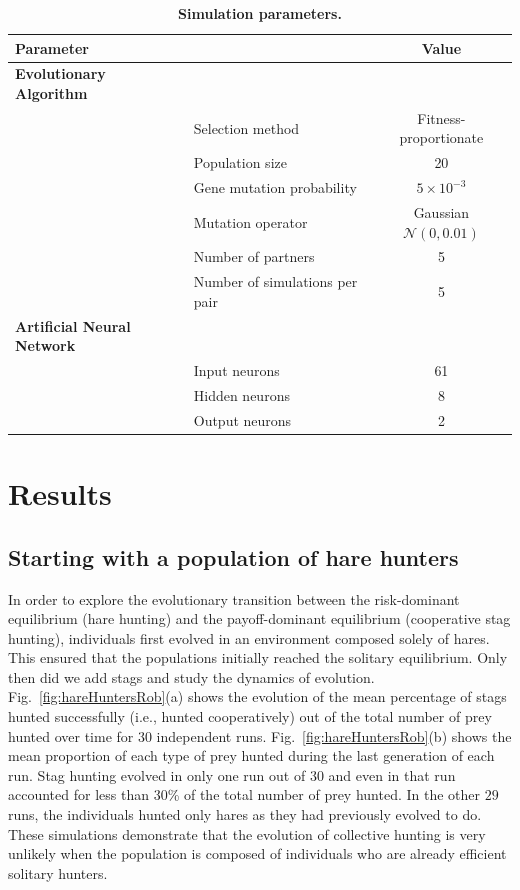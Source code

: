     \begin{table}[ht]
      \centering
        \begin{tabular}{|l|l|c|}
          \hline
          \multicolumn{2}{|l|}{\textbf{Parameter}} & \textbf{Value} \\
          \hline
          \textbf{Evolutionary Algorithm} & & \\
          \hline
          & Selection method & Fitness-proportionate \\
          \hline
          & Population size & 20 \\
          \hline
          & Gene mutation probability & \(5 \times 10^{-3}\) \\
          \hline
          & Mutation operator & Gaussian \(\mathcal{N}(0, 0.01)\) \\
          \hline
          & Number of partners & 5 \\
          \hline
          & Number of simulations per pair & 5 \\
          \hline

          \textbf{Artificial Neural Network} & & \\
          \hline
          & Input neurons & 61 \\
          \hline
          & Hidden neurons & 8 \\
          \hline
          & Output neurons & 2 \\
          \hline
        \end{tabular}
        \caption{\textbf{Simulation parameters.}}
      \label{table:tableParameters}
    \end{table}

\section{Results}
\label{sec:results}
  \subsection{Starting with a population of hare hunters}
    In order to explore the evolutionary transition between the risk-dominant equilibrium (hare hunting) and the payoff-dominant equilibrium (cooperative stag hunting), individuals first evolved in an environment composed solely of hares. This ensured that the populations initially reached the solitary equilibrium. Only then did we add stags and study the dynamics of evolution. Fig.~\ref{fig:hareHuntersRob}(a) shows the evolution of the mean percentage of stags hunted successfully (i.e., hunted cooperatively) out of the total number of prey hunted over time for 30 independent runs. Fig.~\ref{fig:hareHuntersRob}(b) shows the mean proportion of each type of prey hunted during the last generation of each run. Stag hunting evolved in only one run out of $30$ and even in that run accounted for less than 30\% of the total number of prey hunted. In the other $29$ runs, the individuals hunted only hares as they had previously evolved to do. These simulations demonstrate that the evolution of collective hunting is very unlikely when the population is composed of individuals who are already efficient solitary hunters.


